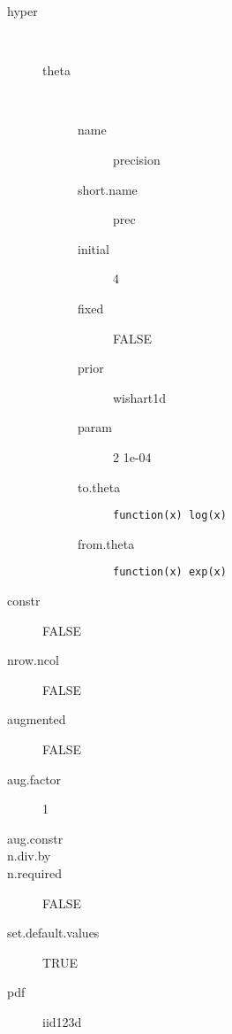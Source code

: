 \begin{description}
	\item[hyper]\ 
	 \begin{description}
	 	\item[theta]\ 
	 	 \begin{description}
	 	 	\item[name] precision
	 	 	\item[short.name] prec
	 	 	\item[initial] 4
	 	 	\item[fixed] FALSE
	 	 	\item[prior] wishart1d
	 	 	\item[param] 2 1e-04
	 	 	\item[to.theta] \verb|function(x) log(x)|
	 	 	\item[from.theta] \verb|function(x) exp(x)|
	 	 \end{description}
	 \end{description}
	\item[constr] FALSE
	\item[nrow.ncol] FALSE
	\item[augmented] FALSE
	\item[aug.factor] 1
	\item[aug.constr] 
	\item[n.div.by] 
	\item[n.required] FALSE
	\item[set.default.values] TRUE
	\item[pdf] iid123d
\end{description}
